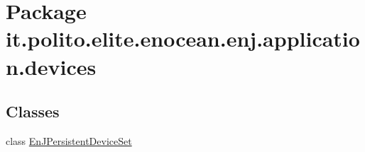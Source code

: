 \hypertarget{namespaceit_1_1polito_1_1elite_1_1enocean_1_1enj_1_1application_1_1devices}{}\section{Package it.\+polito.\+elite.\+enocean.\+enj.\+application.\+devices}
\label{namespaceit_1_1polito_1_1elite_1_1enocean_1_1enj_1_1application_1_1devices}
\subsection*{Classes}
\begin{DoxyCompactItemize}
\item 
class \hyperlink{classit_1_1polito_1_1elite_1_1enocean_1_1enj_1_1application_1_1devices_1_1_en_j_persistent_device_set}{En\+J\+Persistent\+Device\+Set}
\end{DoxyCompactItemize}
